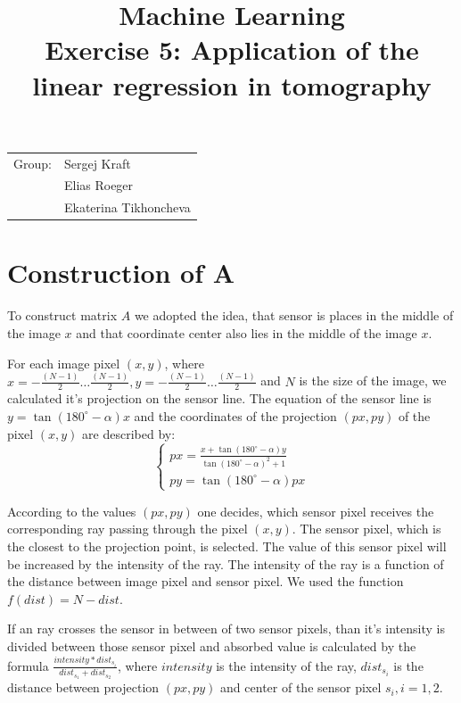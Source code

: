 \documentclass{article}
\title{Machine Learning \\ \bf{Exercise 5: Application of the linear regression
								in tomography} } %
\begin{document}
\maketitle

\begin{center}
\begin{tabular}{l l}
Group: &  Sergej Kraft \\
       & Elias Roeger \\
       & Ekaterina Tikhoncheva \\ 
\end{tabular}
\end{center}

\tableofcontents

\section{Construction of A}

To construct matrix $A$ we adopted the idea, that sensor is places in the middle of the image $x$ and that coordinate center also lies in the middle of the image $x$.

For each image pixel $(x,y)$, where $x=-\frac{(N-1)}{2}\dots\frac{(N-1)}{2}, y=-\frac{(N-1)}{2}\dots\frac{(N-1)}{2}$ and $N$ is the size of the image, we calculated it's projection on the sensor line. The equation of the sensor line is $y=\tan(180^\circ-\alpha) x$ and the coordinates of the projection $(px,py)$ of the pixel $(x,y)$ are described by:
$$\begin{cases}
px = \frac{x+\tan(180^\circ-\alpha)y}{\tan(180^\circ-\alpha)^2+1} \\
py = \tan(180^\circ-\alpha) px
\end{cases}$$

According to the values $(px,py)$ one decides, which sensor pixel receives the corresponding ray passing through the pixel $(x,y)$. The sensor pixel, which is the closest to the projection point, is selected. The value of this sensor pixel will be increased by the intensity of the ray. The intensity of the ray is a function of the distance between image pixel and sensor pixel. We used the function $f(dist) = N - dist$.

If an ray crosses the sensor in between of two sensor pixels, than it's intensity is divided between those sensor pixel and absorbed value is calculated by the formula $\frac{intensity*dist_{s_i}}{dist_{s_1}+dist_{s_2}}$, where $intensity$ is the intensity of the ray, $dist_{s_i}$ is the distance between projection $(px, py)$ and center of the sensor pixel $s_i, i=1,2$.
\end{document}
